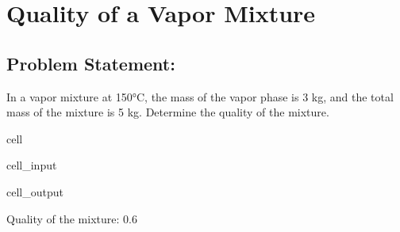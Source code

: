 \documentclass[letterpaper,10pt,english]{jupyterBook}
\begin{document}
\section{Quality of a Vapor Mixture}
\label{\detokenize{notebooks/Chapter2/Problem_5_Quality_of_a_Vapor_Mixture:quality-of-a-vapor-mixture}}\label{\detokenize{notebooks/Chapter2/Problem_5_Quality_of_a_Vapor_Mixture::doc}}

\subsection{Problem Statement:}
\label{\detokenize{notebooks/Chapter2/Problem_5_Quality_of_a_Vapor_Mixture:problem-statement}}
\sphinxAtStartPar
In a vapor mixture at 150°C, the mass of the vapor phase is 3 kg, and the total mass of the mixture is 5 kg.
Determine the quality of the mixture.

\begin{sphinxuseclass}{cell}\begin{sphinxVerbatimInput}

\begin{sphinxuseclass}{cell_input}
\begin{sphinxVerbatim}[commandchars=\\\{\}]

    
    

    

\end{sphinxVerbatim}

\end{sphinxuseclass}\end{sphinxVerbatimInput}
\begin{sphinxVerbatimOutput}

\begin{sphinxuseclass}{cell_output}
\begin{sphinxVerbatim}[commandchars=\\\{\}]
Quality of the mixture: 0.6
\end{sphinxVerbatim}

\end{sphinxuseclass}\end{sphinxVerbatimOutput}

\end{sphinxuseclass}
\sphinxstepscope
\end{document}
